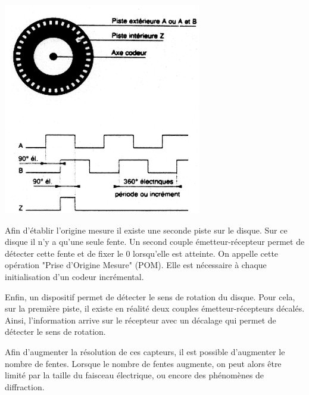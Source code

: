 \documentclass[10pt]{article}
\begin{document}
\begin{minipage}[c]{.35\linewidth}
\begin{center}
    \includegraphics[width=.9\textwidth]{images/codeur_inc2.png}
\end{center}
\end{minipage} \hfill
\begin{minipage}[c]{.6\linewidth}
Afin d'établir l'origine mesure il existe une seconde piste sur le disque. Sur ce disque il n'y a qu'une seule fente. Un second couple émetteur-récepteur permet de détecter cette fente et de fixer le 0 lorsqu'elle est atteinte. On appelle cette opération "Prise d'Origine Mesure" (POM). Elle est nécessaire à chaque initialisation d'un codeur incrémental.

Enfin, un dispositif permet de détecter le sens de rotation du disque. Pour cela, sur la première piste, il existe en réalité deux couples émetteur-récepteurs décalés. Ainsi, l'information arrive sur le récepteur avec un décalage qui permet de détecter le sens de rotation.
\end{minipage}

\vspace{.5cm}
 
Afin d'augmenter la résolution de ces capteurs, il est possible d'augmenter le nombre de fentes. Lorsque le nombre de fentes augmente, on peut alors être limité par la taille du faisceau électrique, ou encore des phénomènes de diffraction. 
\end{document}

